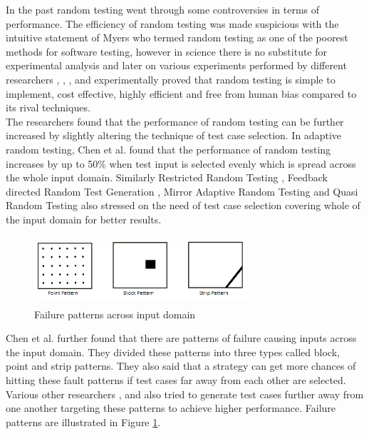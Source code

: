 \documentclass[10pt, conference, compsocconf]{IEEEtran}
\begin{document}
In the past random testing went through some controversies in terms of performance. The efficiency of random testing was made suspicious with the intuitive statement of Myers \cite{Myers2004} who termed random testing as one of the poorest methods for software testing, however in science there is no substitute for experimental analysis and later on various experiments performed by different researchers \cite{Ciupa2007}, \cite{Duran1981}, \cite{Duran1984}, \cite{Hamlet1994} and \cite{Ntafos2001}  experimentally proved that random testing is simple to implement, cost effective, highly efficient and free from human bias compared to its rival techniques. \\

The researchers found that the performance of random testing can be further increased by slightly altering the technique of test case selection. In adaptive random testing, Chen et al.  \cite{Chen2008} found that the performance of random testing increases by up to 50\% when test input is selected evenly which is spread across the whole input domain. Similarly Restricted Random Testing \cite{Chan2002}, Feedback directed Random Test Generation \cite{Pacheco2007a}, Mirror Adaptive Random Testing \cite{Chen2003} and Quasi Random Testing \cite{Chen2005} also stressed on the need of test case selection covering whole of the input domain for better results. \\


\begin{figure}[htp]
\centering
\includegraphics[width=8cm,height=2.5cm]{ART_Patterns.png}
\caption{Failure patterns across input domain \cite{Chen2006}}
\label{fig:patterns}
\end{figure}

Chen et al. \cite{Chen2008} further found that there are patterns of failure causing inputs across the input domain. They divided these patterns into three types called block, point and strip patterns. They also said that a strategy can get more chances of hitting these fault patterns if test cases far away from each other are selected. Various other researchers \cite{Chan2002}, \cite{Chen2003} and \cite{Chen2005} also tried to generate test cases further away from one another targeting these patterns to achieve higher performance. Failure patterns are illustrated in Figure \ref{fig:patterns}.\\
\end{document}
